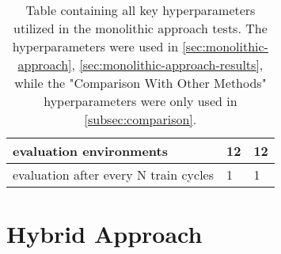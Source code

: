 \begin{table}[H]
\begin{tabularx}{\textwidth}{|X|C{3.8cm}|C{3.8cm}|}
        evaluation environments & 12 & 12 \\
        \hline
        evaluation after every N train cycles & 1 & 1 \\
        \hline
    \end{tabularx}
    \captionsetup{justification=justified, singlelinecheck=false, width=1\linewidth, labelfont=bf} 
    \caption{Table containing all key hyperparameters utilized in the monolithic approach tests. The  hyperparameters were used in \autoref{sec:monolithic-approach}, \autoref{sec:monolithic-approach-results}, while  the "Comparison With Other Methods" hyperparameters were only used in \autoref{subsec:comparison}.}
    \label{tab:mono-approach-hyperparameters}
\end{table}

\section{Hybrid Approach}
\label{app:c}

